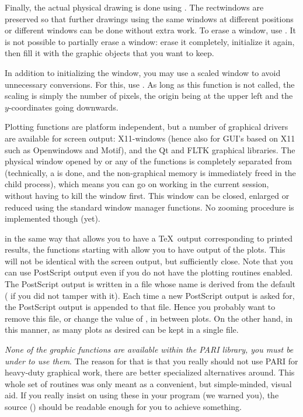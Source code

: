    Finally, the actual physical drawing is done using . The
rectwindows are preserved so that further drawings using the same windows at
different positions or different windows can be done without extra work. To
erase a window, use . It is not possible to partially erase a
window: erase it completely, initialize it again, then fill it with the
graphic objects that you want to keep.

   In addition to initializing the window, you may use a scaled window to
avoid unnecessary conversions. For this, use . As long as this
function is not called, the scaling is simply the number of pixels, the
origin being at the upper left and the $y$-coordinates going downwards.

   Plotting functions are platform independent, but a number of graphical
drivers are available for screen output: X11-windows (hence also for GUI's
based on X11 such as Openwindows and Motif), and the Qt and FLTK graphical
libraries. The physical window opened by  or any of the
 functions is completely separated from  (technically, a
 is done, and the non-graphical memory is immediately freed in the
child process), which means you can go on working in the current 
session, without having to kill the window first. This window can be closed,
enlarged or reduced using the standard window manager functions. No zooming
procedure is implemented though (yet).

 in the same way that  allows you to have a \TeX\ output
corresponding to printed results, the functions starting with  allow
you to have  output of the plots. This will not be identical
with the screen output, but sufficiently close. Note that you can use
PostScript output even if you do not have the plotting routines enabled. The
PostScript output is written in a file whose name is derived from the
 default ( if you did not tamper with it). Each
time a new PostScript output is asked for, the PostScript output is appended
to that file. Hence you probably want to remove this file, or change the
value of , in between plots. On the other hand, in this manner,
as many plots as desired can be kept in a single file. \smallskip

 \emph{None of the graphic functions are available
within the PARI library, you must be under  to use them}. The reason
for that is that you really should not use PARI for heavy-duty graphical work,
there are better specialized alternatives around. This whole set of routines
was only meant as a convenient, but simple-minded, visual aid. If you really
insist on using these in your program (we warned you), the source
() should be readable enough for you to achieve something.

